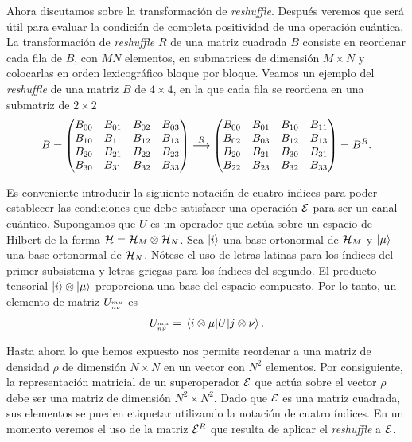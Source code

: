 Ahora discutamos sobre la transformación de \textit{reshuffle}. Después
veremos que será útil para evaluar la condición de completa positividad de
una operación cuántica.
La transformación de \textit{reshuffle} $R$ de una matriz cuadrada $B$ 
consiste en reordenar cada fila de $B$, con $MN$ elementos, 
en submatrices de dimensión $M\times N$ y colocarlas en 
orden lexicográfico bloque por bloque. Veamos un ejemplo del 
\textit{reshuffle} de una matriz $B$ de $4\times 4$, en la que 
cada fila se reordena en una submatriz de $2\times 2$
\begin{align}
B=
\mqty(
B_{00}&B_{01}&B_{02}&B_{03}\\
B_{10}&B_{11}&B_{12}&B_{13}\\
B_{20}&B_{21}&B_{22}&B_{23}\\
B_{30}&B_{31}&B_{32}&B_{33})
\stackrel{R}{\longrightarrow}
\mqty(
B_{00}&B_{01}&B_{10}&B_{11}\\
B_{02}&B_{03}&B_{12}&B_{13}\\
B_{20}&B_{21}&B_{30}&B_{31}\\
B_{22}&B_{23}&B_{32}&B_{33})
=B^R.
\label{eq:reshuffle}
\end{align}

Es conveniente introducir la siguiente notación de cuatro índices 
para poder establecer las condiciones que debe satisfacer una operación 
$\mathcal{E}$ para ser un canal cuántico. Supongamos que $U$ es un operador 
que actúa sobre un espacio de Hilbert de la forma $\mathcal{H}=\mathcal{H}_M\otimes\mathcal{H}_N$.
Sea $\ket{i}$ una base ortonormal de $\mathcal{H}_M$ y $\ket{\mu}$ una base
ortonormal de $\mathcal{H}_N$. Nótese el uso de letras latinas para los índices del
primer subsistema y letras griegas para los índices del segundo.
El producto tensorial $\ket{i}\otimes\ket{\mu}$
proporciona una base del espacio compuesto. Por lo tanto, un 
elemento de matriz $U_{{}^{m\mu}_{n\nu}}$ es 
\begin{align}
U_\ind{m\mu}{n\nu}=\matrixel{i\otimes \mu}{U}{j\otimes \nu}.
\end{align}

Hasta ahora lo que hemos expuesto nos permite reordenar a una matriz
de densidad $\rho$ de dimensión $N\times N$ en un vector con $N^2$ 
elementos. Por consiguiente, la representación matricial de un 
superoperador $\mathcal{E}$ que actúa sobre el vector $\rho$ 
debe ser una matriz de dimensión $N^2\times N^2$. Dado que 
$\mathcal{E}$ es una matriz cuadrada, sus elementos se pueden etiquetar 
utilizando la notación de cuatro índices. En un momento veremos
el uso de la matriz $\mathcal{E}^R$ que resulta de aplicar el \textit{reshuffle}
a $\mathcal{E}$.

